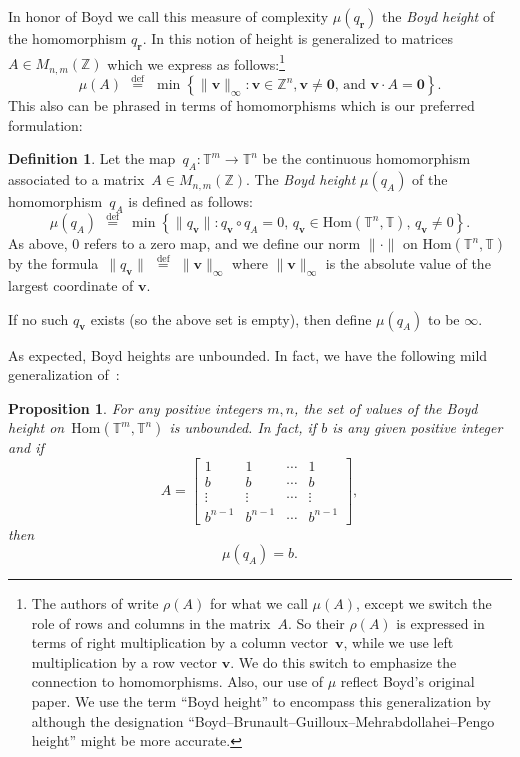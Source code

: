 \documentclass[12pt]{amsart}
\theoremstyle{plain}
\newtheorem{proposition}[theorem]{Proposition}
\theoremstyle{definition}
\newtheorem{definition}[theorem]{Definition}
\theoremstyle{remark}
\numberwithin{theorem}{section}
\numberwithin{equation}{section} %
\newcommand{\defeq}{\stackrel{\mathrm{def}}{\, = \,}}
\newcommand{\bZ}{{\mathbb{Z}}}
\newcommand{\mb}{\mathbf}
\newcommand{\torus}{{\mathbb{T}}}
\begin{document}
In honor of Boyd we call this measure of complexity $\mu\left(q_{\mb r}\right)$ the \emph{Boyd height}
of the homomorphism $q_{\mb r}$.
In \cite[page~1409]{Brunault2024} this notion of height is generalized to matrices $A \in M_{n, m}(\bZ)$
which we express as follows:\footnote{The authors of \cite{Brunault2024} write $\rho(A)$
for what we call $\mu(A)$, except we switch the role of rows and columns in the matrix~$A$.
So their $\rho(A)$ is expressed in terms of right multiplication by a column vector~$\mb v$, while
we use left multiplication by a row vector $\mb v$. We do this switch to emphasize the
connection to homomorphisms.
Also, our use of $\mu$ reflect Boyd's original paper.
We use the term ``Boyd height'' to encompass this generalization by~\cite{Brunault2024} although
the designation ``Boyd--Brunault--Guilloux--Mehrabdollahei--Pengo height''  might be more
accurate.}
$$
\mu\left(A\right) 
\; \defeq \;  
\min 
\left\{ \| \mb v\|_\infty  \colon
    \text{$\mb v \in \bZ^n, \mb v \ne {\mb 0}$, and $\mb v \cdot A = \mb 0$} 
 \right\}.
$$
This also can be phrased in terms of homomorphisms which is our preferred formulation:

\begin{definition}\label{boyd_height_definition}
Let the map~$q_{A} \colon \torus^m \to \torus^n$ be the continuous homomorphism associated to a 
matrix~$A \in M_{n, m}(\bZ)$. The \emph{Boyd height} $\mu\left(q_A\right)$ of the homomorphism~$q_A$ is defined as follows:
$$
\mu\left(q_A\right) \; \defeq \;   \min  \left\{ \| q_{\mb v}  \| \colon q_{\mb v} \circ q_{A}= 0,  \, q_{\mb v} \in \mathrm{Hom}(\torus^n, \torus), \,  q_{\mb v} \ne 0 \right\}.
$$
As above, $0$ refers to a zero map, and we define our norm $\| \cdot \|$ on $\mathrm{Hom}(\torus^n, \torus)$
by the formula~$\| q_{\mb v} \| \; \defeq \; \| \mb v \|_{\infty}$ where $\| \mb v \|_{\infty}$
is the absolute value of the largest coordinate of $\mb v$.

If no such $q_{\mb v}$ exists (so the above set is empty), then define $\mu\left(q_A\right)$ to be $\infty$.
\end{definition}



As expected, Boyd heights are unbounded. In fact, we have the following mild generalization of~\citep[p.~118]{boyd1981}:


\begin{proposition} \label{unbounded_lemma}
For any positive integers $m, n$,  the set of values of the Boyd height 
on~$\mathrm{Hom}(\torus^m, \torus^n)$ is unbounded.
In fact, if $b$ is any given positive integer and if 
$$
A = \begin{bmatrix}
1 & 1 & \cdots & 1 \\
b & b & \cdots & b \\
\vdots & \vdots & \cdots & \vdots \\
b^{n-1} & b^{n-1} & \cdots & b^{n-1}
\end{bmatrix},
$$
then
$$
\mu\left(q_{A}\right)  = b.
$$
\end{proposition}
\end{document}

